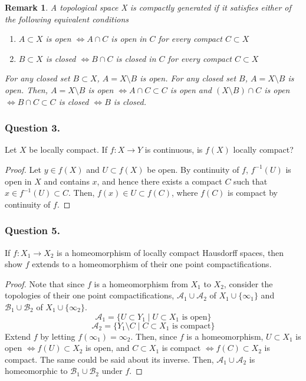 \documentclass[12pt]{article}
\newtheorem{remark}{Remark}
\begin{document}
\begin{remark}
    A topological space X is \textit{compactly generated} if it
satisfies either of the following equivalent conditions
\begin{enumerate}
    \item $A\subset X$ is open $\iff A\cap C$ is open in $C$ for every compact $C \subset X$
    \item $B\subset X$ is closed $\iff B\cap C$ is closed in $C$ for every compact $C \subset X$
\end{enumerate}
For any closed set $B \subset X$,
$A = X \setminus B$ is open. For any closed set $B$, $A = X \setminus B$ is open.
Then, $A = X \setminus B$ is open $\iff A \cap C \subset C$ is open
and $(X \setminus B) \cap C$ is open $\iff B \cap C \subset C$ is closed $\iff B$ is closed.

\end{remark}

\subsubsection*{Question 3.}
Let $X$ be locally compact. If $f: X \rightarrow Y$
is continuous, is $f(X)$ locally compact?
\begin{proof}
    Let $y \in f(X)$ and $U \subset f(X)$ be open. By continuity of $f$, 
    $f^{-1}(U)$ is open in $X$ and contains $x$, and hence there exists a compact $C$
    such that $x \in f^{-1}(U) \subset C$. Then, 
    $f(x) \in U \subset f(C)$, where $f(C)$ is compact by continuity of $f$.

\end{proof}

\subsubsection*{Question 5.} If $f: X_1 \rightarrow X_2$ is a homeomorphism
of locally compact Hausdorff spaces, then show $f$ extends to 
a homeomorphism of their one point compactifications.

\begin{proof}
    Note that since $f$ is a homeomorphism from $X_1$ to 
    $X_2$, consider the topologies of their one point compactifications,
    $\mathcal{A}_1 \cup \mathcal{A}_2$ of $X_1 \cup \{\infty_1\}$
    and $\mathcal{B}_1 \cup \mathcal{B}_2$ of $X_1 \cup \{\infty_2\}$.
    $$\mathcal{A}_1 = \{U \subset Y_1 \mid U \subset X_1 \text{ is open}\}$$
    $$\mathcal{A}_2 = \{Y_1 \setminus C \mid C \subset X_1 \text{ is compact}\}$$
    Extend $f$ by letting $f(\infty_1) = \infty_2$.
    Then, since $f$ is a homeomorphism, $U \subset X_1$ is open $\iff f(U) \subset X_2$
    is open, and $C \subset X_1$ is compact $\iff f(C) \subset X_2$ is compact. The same could 
    be said about its inverse.
    Then, $\mathcal{A}_1 \cup \mathcal{A}_2$ is homeomorphic to $\mathcal{B}_1 \cup \mathcal{B}_2$
    under $f$.
    
\end{proof}
\end{document}
